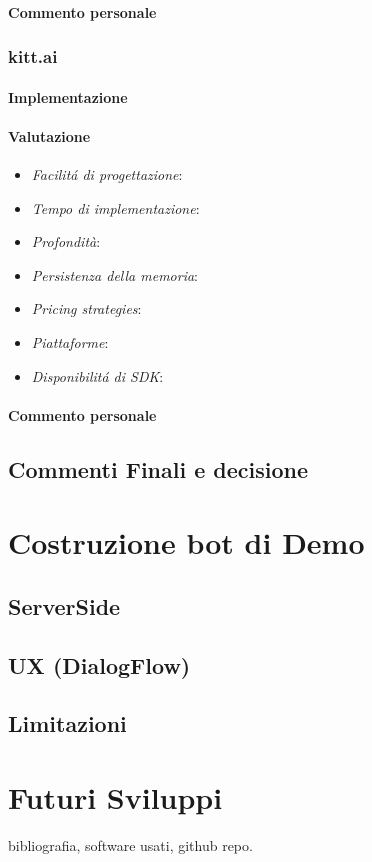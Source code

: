 \documentclass[]{article}
\begin{document}
\paragraph{Commento personale}

\subsubsection{kitt.ai}
\paragraph{Implementazione}
\paragraph{Valutazione}
\begin{itemize}
\item \textit{Facilitá di progettazione}: 
\item \textit{Tempo di implementazione}: 
\item \textit{Profondità}: 
\item \textit{Persistenza della memoria}: 
\item \textit{Pricing strategies}: 
\item \textit{Piattaforme}: 
\item \textit{Disponibilitá di SDK}: 
\end{itemize}
\paragraph{Commento personale}

\subsection{Commenti Finali e decisione}

\section{Costruzione bot di Demo}
\subsection{ServerSide}
\subsection{UX (DialogFlow)}
\subsection{Limitazioni}

\section{Futuri Sviluppi}

\begin{thebibliography}{9}
bibliografia, software usati, github repo.
\end{thebibliography}
\end{document}
